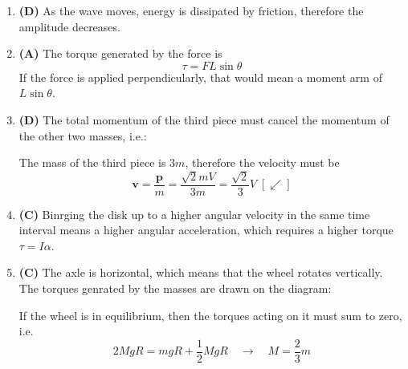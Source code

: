 \documentclass{../../oss-handout}
\begin{document}
\begin{enumerate}[leftmargin=15pt]
\item\textbf{(D)} As the wave moves, energy is dissipated by friction, therefore
  the amplitude decreases.

\item\textbf{(A)} The torque generated by the force is
  \begin{displaymath}
    \tau=FL\sin\theta
  \end{displaymath}
  If the force is applied perpendicularly, that would mean a moment arm of
  $\boxed{L\sin\theta}$.

\item\textbf{(D)} The total momentum of the third piece must cancel the momentum
  of the other two masses, i.e.:
  \begin{center}
  \end{center}
  The mass of the third piece is $3m$, therefore the velocity must be
  \begin{equation*}
    \bm{v}=\frac{\bm{p}}m
    =\frac{\sqrt2mV}{3m}=\boxed{\frac{\sqrt2}3V\;[\swarrow]}
  \end{equation*}
\item\textbf{(C)} Binrging the disk up to a higher angular velocity in the same
  time interval means a higher angular acceleration, which requires a higher
  torque $\tau=I\alpha$.
  \newpage
  
\item\textbf{(C)} The axle is horizontal, which means that the wheel rotates
  vertically. The torques genrated by the masses are drawn on the diagram:
  \begin{center}
  \end{center}
  If the wheel is in equilibrium, then the torques acting on it must sum to
  zero, i.e.
  \begin{displaymath}
    2MgR=mgR+\frac12MgR \quad\longrightarrow\quad\boxed{M=\frac23m}
  \end{displaymath}


\end{enumerate}
\end{document}
